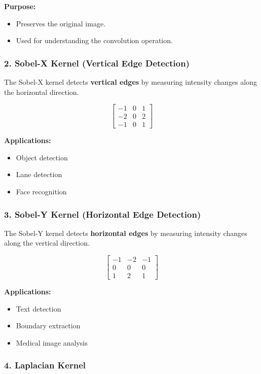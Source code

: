 \documentclass[11pt]{article}
\begin{document}
\textbf{Purpose:}
\begin{itemize}
\item Preserves the original image.
\item Used for understanding the convolution operation.
\end{itemize}

\subsubsection*{2. Sobel-X Kernel (Vertical Edge Detection)}

The Sobel-X kernel detects \textbf{vertical edges} by measuring intensity changes along the horizontal direction.

\[
\begin{bmatrix}
-1 & 0 & 1\\
-2 & 0 & 2\\
-1 & 0 & 1
\end{bmatrix}
\]

\textbf{Applications:}
\begin{itemize}
\item Object detection
\item Lane detection
\item Face recognition
\end{itemize}

\subsubsection*{3. Sobel-Y Kernel (Horizontal Edge Detection)}

The Sobel-Y kernel detects \textbf{horizontal edges} by measuring intensity changes along the vertical direction.

\[
\begin{bmatrix}
-1 & -2 & -1\\
0 & 0 & 0\\
1 & 2 & 1
\end{bmatrix}
\]

\textbf{Applications:}
\begin{itemize}
\item Text detection
\item Boundary extraction
\item Medical image analysis
\end{itemize}

\subsubsection*{4. Laplacian Kernel}
\end{document}
